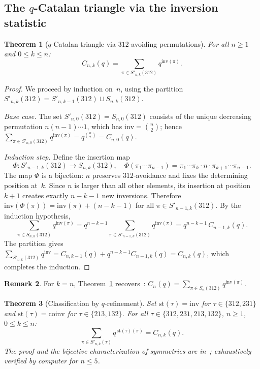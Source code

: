 \documentclass[12pt,a4paper,reqno]{amsart}
\theoremstyle{plain}
\newtheorem{theorem}{Theorem}[section]
\theoremstyle{definition}
\newtheorem{remark}[theorem]{Remark}
\newcommand{\Inv}{\mathrm{inv}}
\newcommand{\Coinv}{\mathrm{coinv}}
\newcommand{\Snk}[1]{S_{n,k}(#1)}
\newcommand{\Snkp}[1]{S'_{n,k}(#1)}
\begin{document}
\subsection{The $q$-Catalan triangle via the inversion statistic}
\begin{theorem}[$q$-Catalan triangle via $312$-avoiding permutations]
\label{thm:qperm}
For all $n\ge1$ and $0\le k\le n$:
\begin{equation}\label{eq:inv312}
C_{n,k}(q) = \sum_{\pi\in\Snkp{312}} q^{\Inv(\pi)}.
\end{equation}
\end{theorem}
\begin{proof}
We proceed by induction on~$n$, using the partition
$\Snkp{312}=S'_{n,k-1}(312)\sqcup\Snk{312}$.

\textit{Base case.}
The set $S'_{n,0}(312)=S_{n,0}(312)$ consists of the unique
decreasing permutation $n(n{-}1)\cdots1$, which has $\Inv=\binom{n}{2}$;
hence $\sum_{\pi\in S'_{n,0}(312)}q^{\Inv(\pi)}=q^{\binom{n}{2}}=C_{n,0}(q)$.

\textit{Induction step.}
Define the insertion map
\[\Phi : S'_{n-1,k}(312)\to\Snk{312},\quad
\Phi(\pi_1\cdots\pi_{n-1})=\pi_1\cdots\pi_k\cdot n\cdot\pi_{k+1}\cdots\pi_{n-1}.\]
The map $\Phi$ is a bijection: $n$ preserves $312$-avoidance and fixes
the determining position at~$k$.
Since $n$ is larger than all other elements, its insertion at position $k+1$
creates exactly $n-k-1$ new inversions.
Therefore $\Inv(\Phi(\pi))=\Inv(\pi)+(n-k-1)$ for all $\pi\in S'_{n-1,k}(312)$.
By the induction hypothesis,
\[\sum_{\pi\in\Snk{312}} q^{\Inv(\pi)}
=q^{n-k-1}\sum_{\pi\in S'_{n-1,k}(312)} q^{\Inv(\pi)}
=q^{n-k-1}\,C_{n-1,k}(q).\]
The partition gives
$\sum_{\Snkp{312}}q^{\Inv}=C_{n,k-1}(q)+q^{n-k-1}C_{n-1,k}(q)=C_{n,k}(q)$,
which completes the induction.
\end{proof}

\begin{remark}\label{rem:FH}
For $k=n$, Theorem~\ref{thm:qperm} recovers~\cite{FH}:
$C_n(q)=\sum_{\pi\in S_n(312)}q^{\Inv(\pi)}$.
\end{remark}

\begin{theorem}[Classification by $q$-refinement]\label{thm:classif_motifs}
Set $\mathrm{st}(\tau)=\Inv$ for $\tau\in\{312,231\}$
and $\mathrm{st}(\tau)=\Coinv$ for $\tau\in\{213,132\}$.
For all $\tau\in\{312,231,213,132\}$, $n\ge1$, $0\le k\le n$:
\begin{equation}\label{eq:unif_4motifs}
\sum_{\pi\in\Snkp{\tau}} q^{\,\mathrm{st}(\tau)(\pi)} = C_{n,k}(q).
\end{equation}
The proof and the bijective characterization of symmetries are in~\cite{W3};
exhaustively verified by computer for $n\le 5$.
\end{theorem}
\end{document}
